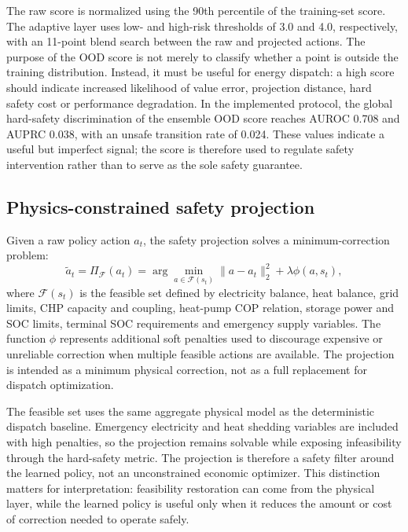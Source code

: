 \documentclass[preprint,12pt]{elsarticle}
\begin{document}
The raw score is normalized using the 90th percentile of the training-set score. The adaptive layer uses low- and high-risk thresholds of 3.0 and 4.0, respectively, with an 11-point blend search between the raw and projected actions. The purpose of the OOD score is not merely to classify whether a point is outside the training distribution. Instead, it must be useful for energy dispatch: a high score should indicate increased likelihood of value error, projection distance, hard safety cost or performance degradation. In the implemented protocol, the global hard-safety discrimination of the ensemble OOD score reaches AUROC 0.708 and AUPRC 0.038, with an unsafe transition rate of 0.024. These values indicate a useful but imperfect signal; the score is therefore used to regulate safety intervention rather than to serve as the sole safety guarantee.

\subsection{Physics-constrained safety projection}

Given a raw policy action $a_t$, the safety projection solves a minimum-correction problem:
\begin{equation}
\tilde{a}_t = \Pi_{\mathcal{F}}(a_t)
= \arg\min_{a \in \mathcal{F}(s_t)} \|a-a_t\|_2^2 + \lambda \phi(a,s_t),
\end{equation}
where $\mathcal{F}(s_t)$ is the feasible set defined by electricity balance, heat balance, grid limits, CHP capacity and coupling, heat-pump COP relation, storage power and SOC limits, terminal SOC requirements and emergency supply variables. The function $\phi$ represents additional soft penalties used to discourage expensive or unreliable correction when multiple feasible actions are available. The projection is intended as a minimum physical correction, not as a full replacement for dispatch optimization.

The feasible set uses the same aggregate physical model as the deterministic dispatch baseline. Emergency electricity and heat shedding variables are included with high penalties, so the projection remains solvable while exposing infeasibility through the hard-safety metric. The projection is therefore a safety filter around the learned policy, not an unconstrained economic optimizer. This distinction matters for interpretation: feasibility restoration can come from the physical layer, while the learned policy is useful only when it reduces the amount or cost of correction needed to operate safely.
\end{document}
